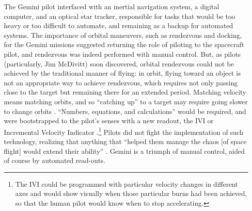 


The Gemini pilot
interfaced with an inertial navigation system, a digital computer, and
an optical star tracker, responsible for tasks that would be too heavy
or too difficult to automate, and remaining as a backup for automated
systems. The importance of orbital maneuvers,
 such as rendezvous and docking, for the Gemini missions suggested returning
the role of piloting to the spacecraft pilot, and rendezvous was
indeed performed with manual control. But, as
pilots (particularly, Jim McDivitt) soon discovered, orbital
rendezvous could not be achieved by the
traditional manner of flying: in orbit, flying toward an object is not
an appropriate way to achieve rendezvous, which requires not only
passing close to the target but remaining there for an extended
period. Matching velocity means matching orbits, and so ``catching
up'' to a target may require going slower to change orbits \cite[p.
  86]{DM}. ``Numbers, equations, and calculations'' would be 
required, and were bootstrapped to the pilot's senses with a new
readout, the IVI or Incremental Velocity Indicator \cite[p.
  86-87]{DM}.\footnote{The IVI could be
programmed with particular velocity changes in different axes and
would show visually when those particular burns had been achieved,
so that the human pilot would know when to stop accelerating.} Pilots
did not fight the implementation of such  
technology, realizing that anything that ``helped them manage the
chaos [of space flight] would extend their ability'' \cite[p. 88]{DM}. Gemini is 
a triumph of manual control, aided of course by automated read-outs.


